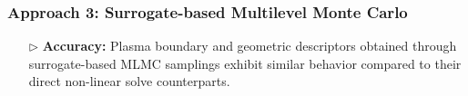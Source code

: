 \documentclass{beamer}
\begin{document}
\begin{frame}[t]
    \frametitle{Approach 3: Surrogate-based Multilevel Monte Carlo}
\begin{itemize}[leftmargin=5pt] 

\item[$\triangleright$] \textcolor{myblue3}{\bf Accuracy:} {\footnotesize Plasma boundary and geometric descriptors obtained through surrogate-based MLMC samplings exhibit similar behavior compared to their direct non-linear solve counterparts.}
\begin{figure}[ht!]\centering
{}
\end{figure}
\end{itemize}
\end{frame}
\end{document}
